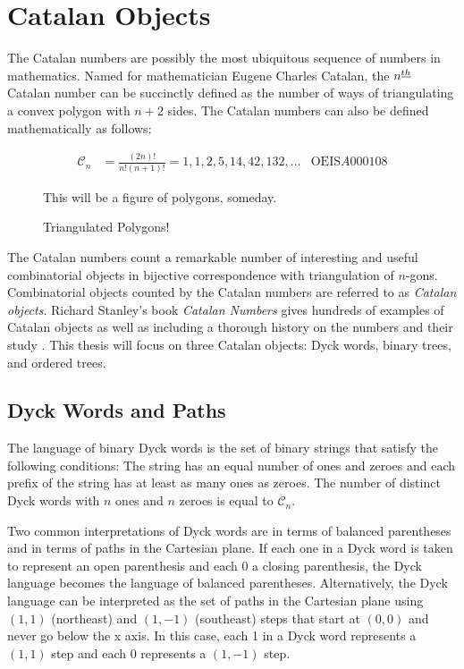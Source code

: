 \chapter{Catalan Objects}
The Catalan numbers are possibly the most ubiquitous sequence of numbers in mathematics.  
Named for mathematician Eugene Charles Catalan, the $n^{\underline{th}}$ Catalan number can be succinctly defined as the number of ways of triangulating a convex polygon with $n+2$ sides.  The Catalan numbers can also be defined mathematically as follows:

\begin{align}
    \mathcal{C}_n &= \frac{(2n)!}{n!(n+1)!} =1, 1, 2, 5, 14, 42, 132, \ldots & \text{OEIS} A000108
\end{align}

\begin{figure}
\begin{center}
    This will be a figure of polygons, someday.
\end{center}
\caption{Triangulated Polygons!}
\label{fig:}
\end{figure}

The Catalan numbers count a remarkable number of interesting and useful combinatorial objects in bijective correspondence with triangulation of $n$-gons. Combinatorial objects counted by the Catalan numbers are referred to as \emph{Catalan objects}.   Richard Stanley's book \emph{Catalan Numbers} gives hundreds of examples of Catalan objects  as well as including a thorough history on the numbers and their study \cite{stanley2015catalan}. This thesis will focus on three Catalan objects: Dyck words, binary trees, and ordered trees. 
\section{Dyck Words and Paths}
The language of binary Dyck words is the set of binary strings that satisfy the following conditions: The string has an equal number of ones and zeroes and each prefix of the string has at least as many ones as zeroes.  The number of distinct Dyck words with $n$ ones and $n$ zeroes is equal to $\mathcal{C}_n$.

Two common interpretations of Dyck words are in terms of balanced parentheses and in terms of paths in the Cartesian plane. If each one in a Dyck word is taken to represent an open parenthesis and each 0 a closing parenthesis, the Dyck language becomes the language of balanced parentheses.  Alternatively, the Dyck language can be interpreted as the set of paths in the Cartesian plane using $(1,1)$ (northeast) and $(1,-1)$ (southeast) steps that start at $(0,0)$ and never go below the x axis. In this case, each 1 in a Dyck word represents a $(1,1)$ step and each 0 represents a $(1,-1)$ step.

